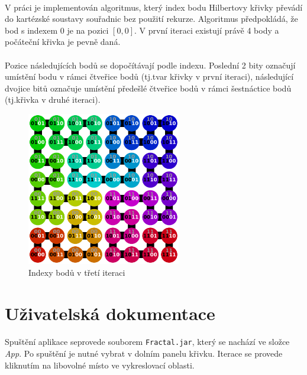 \documentclass[12pt]{scrartcl}
\begin{document}
\paragraph{}
V práci je implementován algoritmus, který index bodu Hilbertovy křivky převádí do kartézské soustavy souřadnic bez použití rekurze. Algoritmus předpokládá, že bod s indexem $0$ je na pozici $[0,0]$. V první iteraci existují právě 4 body a počáteční křivka je pevně daná.

\paragraph{}
Pozice následujících bodů se dopočítávají podle indexu. Poslední 2 bity označují umístění bodu v rámci čtveřice bodů (tj.\nobreakspace tvar křivky v první iteraci), následující dvojice bitů označuje umístění předešlé čtveřice bodů v rámci šestnáctice bodů (tj.\nobreakspace křivka v druhé iteraci).

\begin{figure}[!ht]
	\centering
	\label{obr:polekolizi}
	\includegraphics[width=0.6\textwidth,natwidth=1,natheight=1]{hilbert.pdf}
	\caption{Indexy bodů v třetí iteraci}
\end{figure}

\newpage
\section{Uživatelská dokumentace}

\paragraph{}
Spuštění aplikace se\nobreakspace provede souborem \texttt{Fractal.jar}, který se nachází ve složce \emph{App}. Po spuštění je nutné vybrat v dolním panelu křivku. Iterace se provede kliknutím na libovolné místo ve vykreslovací oblasti.
\end{document}
